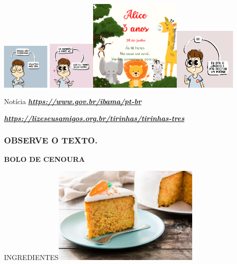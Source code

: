 \includegraphics[width=0.90835in,height=0.87172in]{media/image143.png}
\includegraphics[width=0.90912in,height=0.90912in]{media/image145.png}\includegraphics[width=1.74653in,height=1.74653in]{media/image147.png}\includegraphics[width=1.18333in,height=1.18333in]{media/image152.png}

Notícia
\href{https://www.gov.br/ibama/pt-br}{\textbf{\emph{https://www.gov.br/ibama/pt-br}}}

\href{https://lizeseusamigos.org.br/tirinhas/tirinhas-tres}{\textbf{\emph{https://lizeseusamigos.org.br/tirinhas/tirinhas-tres}}}

\subsubsection{OBSERVE O TEXTO.}\label{observe-o-texto.}

\textbf{BOLO DE CENOURA}

INGREDIENTES\includegraphics[width=2.79286in,height=1.86042in]{media/image153.jpg}

